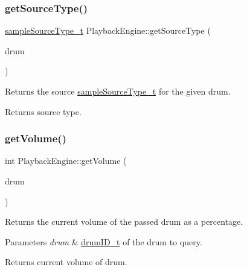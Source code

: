 \subsubsection{\texorpdfstring{get\+Source\+Type()}{getSourceType()}}
{\footnotesize\ttfamily \hyperlink{namespacedrumpi_1_1audio_a997f55e8a5b5348cf74dbedb7abe8a59}{sample\+Source\+Type\+\_\+t} Playback\+Engine\+::get\+Source\+Type (\begin{DoxyParamCaption}\item[{\hyperlink{namespacedrumpi_a3897274035c1b939a604438abe648b1b}{drum\+I\+D\+\_\+t}}]{drum }\end{DoxyParamCaption})}

Returns the source \hyperlink{namespacedrumpi_1_1audio_a997f55e8a5b5348cf74dbedb7abe8a59}{sample\+Source\+Type\+\_\+t} for the given drum. \begin{DoxyReturn}{Returns}
source type. 
\end{DoxyReturn}
\mbox{\label{classdrumpi_1_1audio_1_1PlaybackEngine_aac50bd6f33b60955821231a57a9adc18}} 
\subsubsection{\texorpdfstring{get\+Volume()}{getVolume()}\hspace{0.1cm}{\footnotesize\ttfamily [1/2]}}
{\footnotesize\ttfamily int Playback\+Engine\+::get\+Volume (\begin{DoxyParamCaption}\item[{\hyperlink{namespacedrumpi_a3897274035c1b939a604438abe648b1b}{drum\+I\+D\+\_\+t}}]{drum }\end{DoxyParamCaption})}

Returns the current volume of the passed drum as a percentage. 
\begin{DoxyParams}{Parameters}
{\em drum} & \hyperlink{namespacedrumpi_a3897274035c1b939a604438abe648b1b}{drum\+I\+D\+\_\+t} of the drum to query. \\
\hline
\end{DoxyParams}
\begin{DoxyReturn}{Returns}
current volume of drum. 
\end{DoxyReturn}
\mbox{\label{classdrumpi_1_1audio_1_1PlaybackEngine_a3125be4c0e13e4a97c10d318e32a63b8}} 
